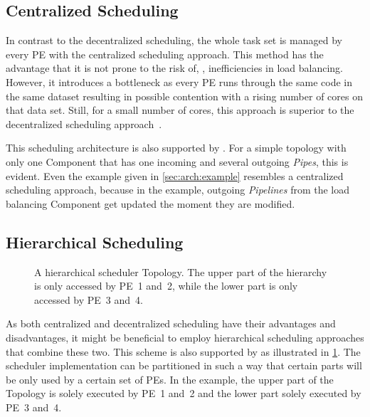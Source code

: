 \subsection{Centralized Scheduling}%
\label{sec:prop:computation:centralized}

In contrast to the decentralized scheduling, the whole task set is managed by every \ac{PE} with the centralized scheduling approach. This method has the advantage that it is not prone to the risk of, \eg{}, inefficiencies in load balancing. However, it introduces a bottleneck as every \ac{PE} runs through the same code in the same dataset resulting in possible contention with a rising number of cores on that data set. Still, for a small number of cores, this approach is superior to the decentralized scheduling approach~\cite{Nabelsee-2016-Centralized}.

This scheduling architecture is also supported by \cobas{}. For a simple topology with only one Component that has one incoming and several outgoing \emph{Pipes}, this is evident. Even the example given in \cref{sec:arch:example} resembles a centralized scheduling approach, because in the example, outgoing \emph{Pipelines} from the load balancing Component get updated the moment they are modified.

\subsection{Hierarchical Scheduling}%
\label{sec:prop:computation:hierarchical}

\begin{figure}[t!] \centering
	\caption[A hierarchical scheduler Topology.]{A hierarchical scheduler Topology. The upper part of the hierarchy is only accessed by \ac{PE}~1 and~2, while the lower part is only accessed by \ac{PE}~3 and~4.}%
	\label{fig:feature:hierarchy}
\end{figure}

As both centralized and decentralized scheduling have their advantages and disadvantages, it might be beneficial to employ hierarchical scheduling approaches that combine these two. This scheme is also supported by \cobas{} as illustrated in \cref{fig:feature:hierarchy}. The scheduler implementation can be partitioned in such a way that certain parts will be only used by a certain set of \acp{PE}. In the example, the upper part of the Topology is solely executed by \ac{PE}~1 and~2 and the lower part solely executed by \ac{PE}~3 and~4.

